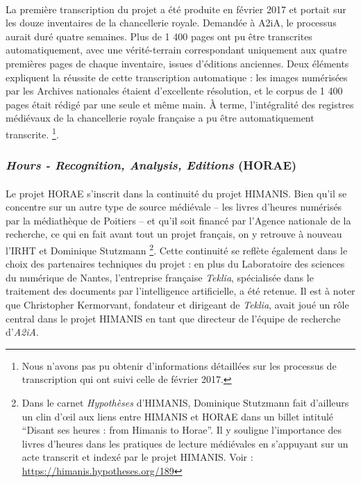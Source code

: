 \documentclass[a4paper,12pt,twoside]{book}
\begin{document}
\paragraph{}
La première transcription du projet a été produite en février 2017 et portait sur les douze inventaires de la chancellerie royale. Demandée à A2iA, le processus aurait duré quatre semaines. Plus de 1 400 pages ont pu être transcrites automatiquement, avec une vérité-terrain correspondant uniquement aux quatre premières pages de chaque inventaire, issues d’éditions anciennes. Deux éléments expliquent la réussite de cette transcription automatique : les images numérisées par les Archives nationales étaient d’excellente résolution, et le corpus de 1 400 pages était rédigé par une seule et même main. À terme, l’intégralité des registres médiévaux de la chancellerie royale française a pu être automatiquement transcrite. \footnote{Nous n’avons pas pu obtenir d’informations détaillées sur les processus de transcription qui ont suivi celle de février 2017.}.

\subsubsection{\textit{Hours - Recognition, Analysis, Editions } (HORAE)}

\paragraph{}
Le projet HORAE s’inscrit dans la continuité du projet HIMANIS. Bien qu’il se concentre sur un autre type de source médiévale – les livres d’heures numérisés par la médiathèque de Poitiers – et qu’il soit financé par l’Agence nationale de la recherche, ce qui en fait avant tout un projet français, on y retrouve à nouveau l’IRHT et Dominique Stutzmann \footnote{Dans le carnet \textit{Hypothèses} d’HIMANIS, Dominique Stutzmann fait d’ailleurs un clin d’œil aux liens entre HIMANIS et HORAE dans un billet intitulé \enquote{Disant ses heures : from Himanis to Horae}. Il y souligne l’importance des livres d’heures dans les pratiques de lecture médiévales en s’appuyant sur un acte transcrit et indexé par le projet HIMANIS. Voir : \url{https://himanis.hypotheses.org/189}}. Cette continuité se reflète également dans le choix des partenaires techniques du projet : en plus du Laboratoire des sciences du numérique de Nantes, l’entreprise française \textit{Teklia}, spécialisée dans le traitement des documents par l’intelligence artificielle, a été retenue. Il est à noter que Christopher Kermorvant, fondateur et dirigeant de \textit{Teklia}, avait joué un rôle central dans le projet HIMANIS en tant que directeur de l’équipe de recherche d’\textit{A2iA}.
\end{document}

